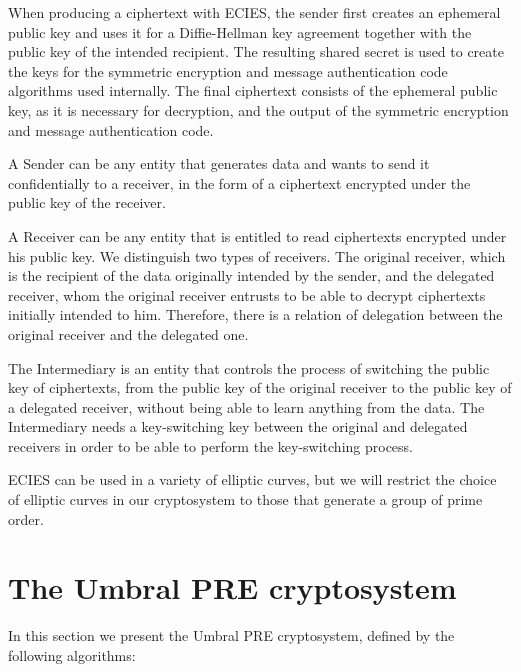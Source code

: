 \documentclass[12pt]{article}
\begin{document}
When producing a ciphertext with ECIES, the sender first creates an ephemeral public key and uses it for a Diffie-Hellman key agreement together with the public key of the intended recipient. The resulting shared secret is used to create the keys for the symmetric encryption and message authentication code algorithms used internally. The final ciphertext consists of the ephemeral public key, as it is necessary for decryption, and the output of the symmetric encryption and message authentication code.

A Sender can  be any entity that generates data and wants to send it confidentially to a receiver, in the form of a ciphertext encrypted under the public key of the receiver. 

A Receiver can be any entity that is entitled to read ciphertexts encrypted under his public key. We distinguish two types of receivers. The original receiver, which is the recipient of the data originally intended by the sender, and the delegated receiver, whom the original receiver entrusts to be able to decrypt ciphertexts initially intended to him. Therefore, there is a relation of delegation between the original receiver and the delegated one. 

The Intermediary is an entity that controls the process of switching the public key of ciphertexts, from the public key of the original receiver to the public key of a delegated receiver, without being able to learn anything from the data. The Intermediary needs a key-switching key between the original and delegated receivers in order to be able to perform the key-switching process.

ECIES can be used in a variety of elliptic curves, but we will restrict the choice of elliptic curves in our cryptosystem to those that generate a group of prime order. %

\section{The Umbral PRE cryptosystem}

In this section we present the Umbral PRE cryptosystem, defined by the following algorithms:
\end{document}
